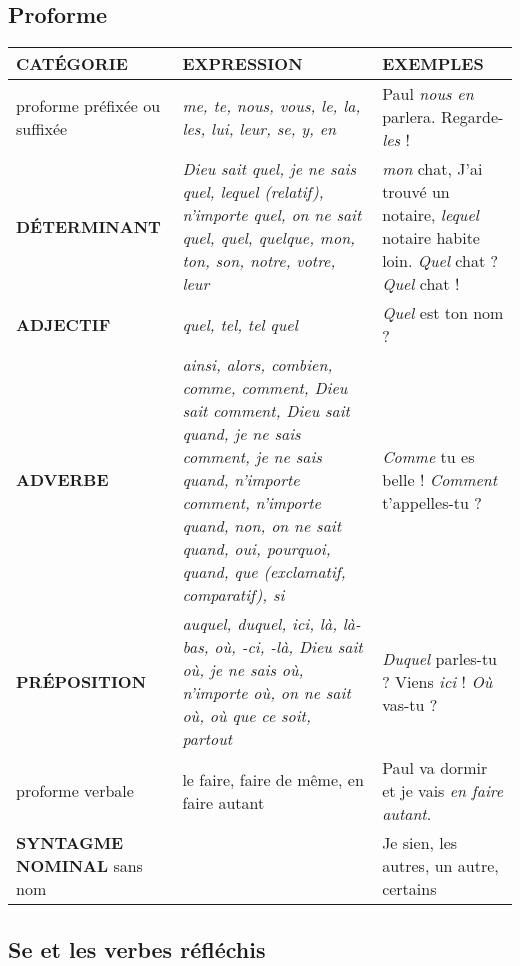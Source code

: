 \documentclass[UTF8]{report}
\begin{document}
\subsection{Proforme}
\begin{table}[H]
\centering
\begin{tabular}{|p{3cm}|p{5cm}|p{5cm}|}
\hline
\rowcolor{cyan!20}
\textbf{CATÉGORIE} & \textbf{EXPRESSION} & \textbf{EXEMPLES} \\ \hline
proforme préfixée ou suffixée & \textit{me, te, nous, vous, le, la, les, lui, leur, se, y, en} & Paul \textit{nous en} parlera. Regarde-\textit{les} ! \\ \hline
\textbf{DÉTERMINANT} & \textit{Dieu sait quel, je ne sais quel, lequel (relatif), n'importe quel, on ne sait quel, quel, quelque, mon, ton, son, notre, votre, leur} & \textit{mon} chat, J'ai trouvé un notaire, \textit{lequel} notaire habite loin. \textit{Quel} chat ? \textit{Quel} chat ! \\ \hline
\textbf{ADJECTIF} & \textit{quel, tel, tel quel} & \textit{Quel} est ton nom ? \\ \hline
\textbf{ADVERBE} & \textit{ainsi, alors, combien, comme, comment, Dieu sait comment, Dieu sait quand, je ne sais comment, je ne sais quand, n'importe comment, n'importe quand, non, on ne sait quand, oui, pourquoi, quand, que (exclamatif, comparatif), si} & \textit{Comme} tu es belle ! \textit{Comment} t'appelles-tu ? \\ \hline
\textbf{PRÉPOSITION} & \textit{auquel, duquel, ici, là, là-bas, où, -ci, -là, Dieu sait où, je ne sais où, n'importe où, on ne sait où, où que ce soit, partout} & \textit{Duquel} parles-tu ? Viens \textit{ici} ! \textit{Où} vas-tu ? \\ \hline
proforme verbale & le faire, faire de même, en faire autant & Paul va dormir et je vais \textit{en faire autant}.  \\ \hline
\textbf{SYNTAGME NOMINAL} sans nom & & Je sien, les autres, un autre, certains \\ \hline
\end{tabular}
\label{tab:grammatical}
\end{table}

\subsection{Se et les verbes réfléchis}
\end{document}
